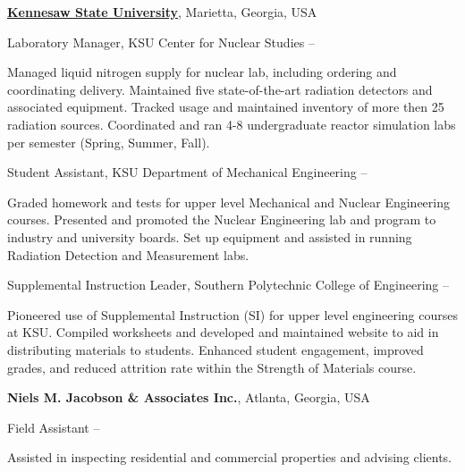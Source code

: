 \documentclass[
letterpaper,
MMMyyyy,
nonstopmode,
draftmode,
]{resume}
\begin{document}
\begin{Body}
\BigGap

\Entry
\href{http://kennesaw.edu/}
{\textbf{Kennesaw State University}},
Marietta, Georgia, USA

\Gap
\BulletItem
Laboratory Manager,
KSU Center for Nuclear Studies
\hfill
{} --
\begin{Detail}
\SubBulletItem
Managed liquid nitrogen supply for nuclear lab, including ordering and coordinating delivery.
\SubBulletItem
Maintained five state-of-the-art radiation detectors and associated equipment.
\SubBulletItem
Tracked usage and maintained inventory of more then 25 radiation sources.
\SubBulletItem
Coordinated and ran 4-8 undergraduate reactor simulation labs per semester (Spring, Summer, Fall).
\end{Detail}

\Gap
\BulletItem
Student Assistant,
KSU Department of Mechanical Engineering
\hfill
{} --
\begin{Detail}
\SubBulletItem
Graded homework and tests for upper level Mechanical and Nuclear Engineering courses.
\SubBulletItem
Presented and promoted the Nuclear Engineering lab and program to industry and university boards.
\SubBulletItem
Set up equipment and assisted in running Radiation Detection and Measurement labs.
\end{Detail}

\Gap
\BulletItem
Supplemental Instruction Leader,
Southern Polytechnic College of Engineering
\hfill
{} --
\begin{Detail}
\SubBulletItem
Pioneered use of Supplemental Instruction (SI) for upper level engineering courses at KSU.
\SubBulletItem
Compiled worksheets and developed and maintained website to aid in distributing materials to students.
\SubBulletItem
Enhanced student engagement, improved grades, and reduced attrition rate within the Strength of Materials course.
\end{Detail}

\BigGap

\Entry
\textbf{Niels M. Jacobson \& Associates Inc.},
Atlanta, Georgia, USA

\Gap
\BulletItem
Field Assistant
\hfill
{} --
\begin{Detail}
\SubBulletItem
Assisted in inspecting residential and commercial properties and advising clients.
\end{Detail}



\end{Body}
\end{document}
